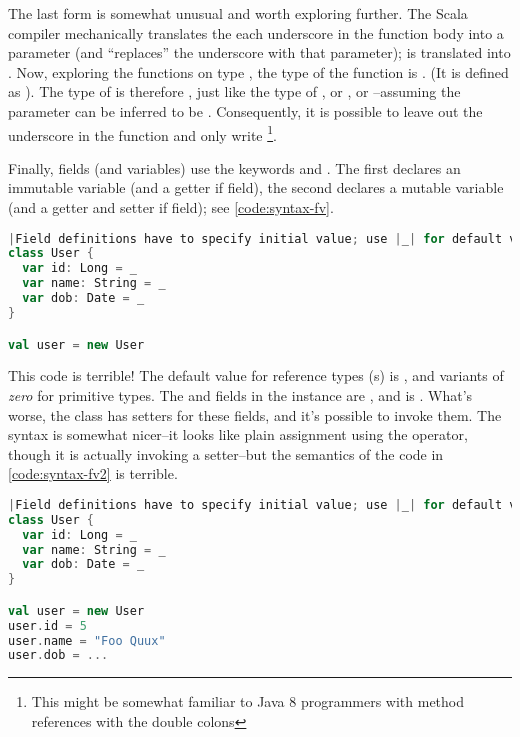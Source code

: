 \documentclass[10 pt]{article}
\begin{document}
The last form  is somewhat unusual and worth exploring further. The Scala compiler mechanically translates the each underscore in the function body into a parameter (and ``replaces'' the underscore with that parameter);  is translated into . Now, exploring the functions on type , the type of the function \pcode{*} is . (It is defined as ). The type of  is therefore , just like the type of , or , or --assuming the parameter can be inferred to be . Consequently, it is possible to leave out the underscore in the  function and only write \footnote{This might be somewhat familiar to Java 8 programmers with method references with the double colons}.

Finally, fields (and variables) use the keywords  and . The first declares an immutable variable (and a getter if field), the second declares a mutable variable (and a getter and setter if field); see \autoref{code:syntax-fv}.

\begin{lstlisting}[caption={Fields \& variables}, label={code:syntax-fv}, language=Scala, escapechar=|]
|Field definitions have to specify initial value; use |_| for default value.|
class User {
  var id: Long = _
  var name: String = _
  var dob: Date = _
}

val user = new User
\end{lstlisting}

This code is terrible! The default value for reference types (s) is , and variants of \emph{zero} for primitive types. The  and  fields in the  instance are , and  is . What's worse, the class has setters for these fields, and it's possible to invoke them. The syntax is somewhat nicer--it looks like plain assignment using the \pcode{=} operator, though it is actually invoking a setter--but the semantics of the code in \autoref{code:syntax-fv2} is terrible.

\begin{lstlisting}[caption={Fields \& variables II}, label={code:syntax-fv2}, language=Scala, escapechar=|]
|Field definitions have to specify initial value; use |_| for default value.|
class User {
  var id: Long = _
  var name: String = _
  var dob: Date = _
}

val user = new User
user.id = 5
user.name = "Foo Quux"
user.dob = ...
\end{lstlisting}
\end{document}
